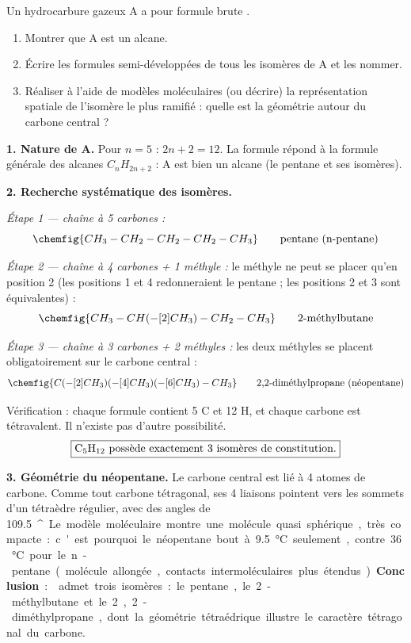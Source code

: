 \documentclass[11pt]{article}
\providecommand{\degree}{^{\circ}}
\newcommand{\cle}[1]{{\popxbold\color{popdark}#1}}
\begin{document}
\begin{exoresolu}
Un hydrocarbure gazeux A a pour formule brute .
\begin{enumerate}
\item Montrer que A est un alcane.
\item Écrire les formules semi-développées de tous les isomères de A et les nommer.
\item Réaliser à l'aide de modèles moléculaires (ou décrire) la représentation spatiale de l'isomère le plus ramifié : quelle est la géométrie autour du carbone central ?
\end{enumerate}
\tcblower
\textbf{1. Nature de A.} Pour $n = 5$ : $2n + 2 = 12$. La formule  répond à la formule générale des alcanes $C_nH_{2n+2}$ : A est bien un alcane (le pentane et ses isomères).

\textbf{2. Recherche systématique des isomères.}

\emph{Étape 1 — chaîne à 5 carbones :}
\[ \chemfig{CH_3-CH_2-CH_2-CH_2-CH_3} \qquad \text{pentane (n-pentane)} \]

\emph{Étape 2 — chaîne à 4 carbones + 1 méthyle :} le méthyle ne peut se placer qu'en position 2 (les positions 1 et 4 redonneraient le pentane ; les positions 2 et 3 sont équivalentes) :
\[ \chemfig{CH_3-CH(-[2]CH_3)-CH_2-CH_3} \qquad \text{2-méthylbutane} \]

\emph{Étape 3 — chaîne à 3 carbones + 2 méthyles :} les deux méthyles se placent obligatoirement sur le carbone central :
\[ \chemfig{C(-[2]CH_3)(-[4]CH_3)(-[6]CH_3)-CH_3} \qquad \text{2,2-diméthylpropane (néopentane)} \]

Vérification : chaque formule contient 5 C et 12 H, et chaque carbone est tétravalent. Il n'existe pas d'autre possibilité.
\[ \boxed{\text{\ce{C5H12} possède exactement 3 isomères de constitution.}} \]

\textbf{3. Géométrie du néopentane.} Le carbone central est lié à 4 atomes de carbone. Comme tout carbone tétragonal, ses 4 liaisons pointent vers les sommets d'un \cle{tétraèdre régulier}, avec des angles de \SI{109,5}{\degree}. Le modèle moléculaire montre une molécule quasi sphérique, très compacte : c'est pourquoi le néopentane bout à \SI{9,5}{\celsius} seulement, contre \SI{36}{\celsius} pour le n-pentane (molécule allongée, contacts intermoléculaires plus étendus).

\textbf{Conclusion} :  admet trois isomères : le pentane, le 2-méthylbutane et le 2,2-diméthylpropane, dont la géométrie tétraédrique illustre le caractère tétragonal du carbone.
\end{exoresolu}
\end{document}
